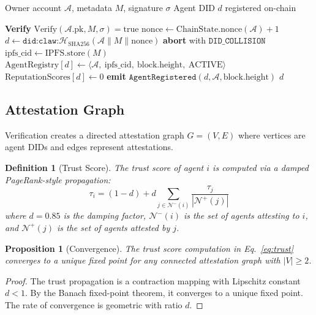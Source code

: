 \documentclass{article}
\newtheorem{proposition}[theorem]{Proposition}
\newtheorem{definition}{Definition}
\begin{document}
\begin{algorithm}[t]
\caption{Agent Registration Protocol}
\label{alg:registration}
\begin{algorithmic}[1]
\REQUIRE Owner account $\mathcal{A}$, metadata $M$, signature $\sigma$
\ENSURE Agent DID $d$ registered on-chain

\STATE \textbf{Verify} $\text{Verify}(\mathcal{A}.\text{pk}, M, \sigma) = \text{true}$
\STATE $\text{nonce} \leftarrow \text{ChainState.nonce}(\mathcal{A}) + 1$
\STATE $d \leftarrow \texttt{did:claw:}\mathcal{H}_{\text{SHA256}}(\mathcal{A} \| M \| \text{nonce})$
    \STATE \textbf{abort} with $\texttt{DID\_COLLISION}$
\ENDIF
\STATE $\text{ipfs\_cid} \leftarrow \text{IPFS.store}(M)$ 
\STATE $\text{AgentRegistry}[d] \leftarrow \langle \mathcal{A},\ \text{ipfs\_cid},\ \text{block.height},\ \text{ACTIVE} \rangle$
\STATE $\text{ReputationScores}[d] \leftarrow 0$
\STATE \textbf{emit} $\texttt{AgentRegistered}(d, \mathcal{A}, \text{block.height})$
\RETURN $d$
\end{algorithmic}
\end{algorithm}

\subsection{Attestation Graph}

Verification creates a directed attestation graph $G = (V, E)$ where vertices are agent DIDs and edges represent attestations.

\begin{definition}[Trust Score]
The trust score of agent $i$ is computed via a damped PageRank-style propagation:
\begin{equation}\label{eq:trust}
    \tau_i = (1 - d) + d \sum_{j \in \mathcal{N}^{-}(i)} \frac{\tau_j}{|\mathcal{N}^{+}(j)|}
\end{equation}
where $d = 0.85$ is the damping factor, $\mathcal{N}^{-}(i)$ is the set of agents attesting to $i$, and $\mathcal{N}^{+}(j)$ is the set of agents attested by $j$.
\end{definition}

\begin{proposition}[Convergence]
The trust score computation in Eq.~\eqref{eq:trust} converges to a unique fixed point for any connected attestation graph with $|V| \geq 2$.
\end{proposition}

\begin{proof}
The trust propagation is a contraction mapping with Lipschitz constant $d < 1$. By the Banach fixed-point theorem, it converges to a unique fixed point. The rate of convergence is geometric with ratio $d$.
\end{proof}
\end{document}
